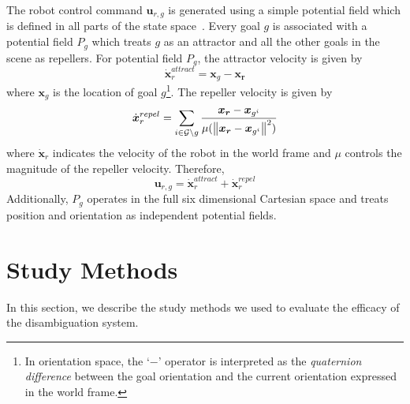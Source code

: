 The robot control command $\boldsymbol{u}_{r,g}$ is generated using a simple potential field which is defined in all parts of the state space~\cite{khatib1986real}. Every goal $g$ is associated with a potential field $P_g$ which treats $g$ as an attractor and all the other goals in the scene as repellers. For potential field $P_g$, the attractor velocity is given by
\begin{equation*}
\dot{\boldsymbol{x}}_r^{attract} = \boldsymbol{x}_{g} - \boldsymbol{x_r}
\end{equation*}
where $\boldsymbol{x}_{g}$ is the location of goal $g$\footnote{In orientation space, the `$-$' operator is interpreted as the \textit{quaternion difference} between the goal orientation and the current orientation expressed in the world frame.}. The repeller velocity is given by
\begin{equation*}
\dot{\boldsymbol{x}}_r^{repel} = \sum_{i \in \mathcal{G} \setminus g} \frac{\boldsymbol{x_r} - \boldsymbol{x}_{g^i}}{\mu(\left\lVert\boldsymbol{x_r} - \boldsymbol{x}_{g^i}\right\rVert^2)}
\end{equation*}
where $\dot{\boldsymbol{x}}_r$ indicates the velocity of the robot in the world frame and $\mu$ controls the magnitude of the repeller velocity. Therefore, 
\begin{equation*}
\boldsymbol{u}_{r,g} = \dot{\boldsymbol{x}}_r^{attract} + \dot{\boldsymbol{x}}_r^{repel} 
\end{equation*}
Additionally, $P_g$ operates in the full six dimensional Cartesian space and treats position and orientation as independent potential fields. 
%
%
%


\section{Study Methods}\label{sec:ed}
In this section, we describe the study methods we used to evaluate the efficacy of the disambiguation system. 
